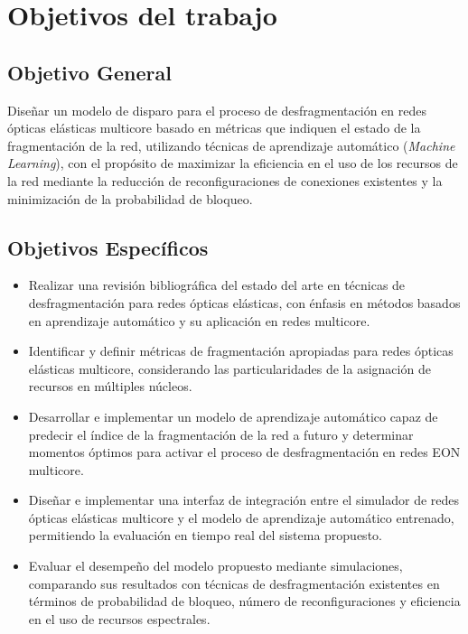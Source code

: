 \section{Objetivos del trabajo}
\subsection{Objetivo General}
Diseñar un modelo de disparo para el proceso de desfragmentación en redes ópticas elásticas multicore basado en métricas que indiquen el estado de la fragmentación de la red, utilizando técnicas de aprendizaje automático (\textit{Machine Learning}), con el propósito de maximizar la eficiencia en el uso de los recursos de la red mediante la reducción de reconfiguraciones de conexiones existentes y la minimización de la probabilidad de bloqueo. 

\subsection{Objetivos Específicos}
\begin{itemize}
    \item Realizar una revisión bibliográfica del estado del arte en técnicas de desfragmentación para redes ópticas elásticas, con énfasis en métodos basados en aprendizaje automático y su aplicación en redes multicore.

    \item Identificar y definir métricas de fragmentación apropiadas para redes ópticas elásticas multicore, considerando las particularidades de la asignación de recursos en múltiples núcleos.
    
    \item Desarrollar e implementar un modelo de aprendizaje automático capaz de predecir el índice de la fragmentación de la red a futuro y determinar momentos óptimos para activar el proceso de desfragmentación en redes EON multicore.
    
    \item Diseñar e implementar una interfaz de integración entre el simulador de redes ópticas elásticas multicore y el modelo de aprendizaje automático entrenado, permitiendo la evaluación en tiempo real del sistema propuesto.
    
    \item Evaluar el desempeño del modelo propuesto mediante simulaciones, comparando sus resultados con técnicas de desfragmentación existentes en términos de probabilidad de bloqueo, número de reconfiguraciones y eficiencia en el uso de recursos espectrales.
\end{itemize}
%

